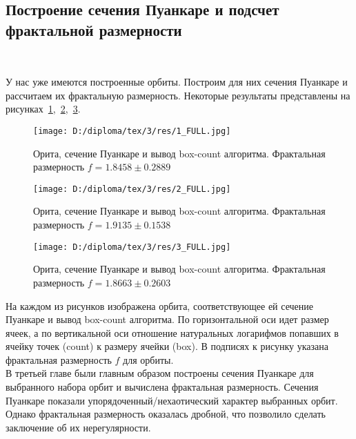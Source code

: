 \subsection{Построение сечения Пуанкаре и подсчет фрактальной размерности}
~\par
У нас уже имеются построенные орбиты. Построим для них сечения Пуанкаре и рассчитаем их фрактальную размерность. Некоторые результаты представлены на рисунках~\ref{stohast:1},~\ref{stohast:2},~\ref{stohast:3}.
{
\begin{figure}[H]
\centering
\begin{minipage}[t]{0.8\textwidth}
\centering
\texttt{[image: D:/diploma/tex/3/res/1\_FULL.jpg]}
\end{minipage}
\caption{Орита, сечение Пуанкаре и вывод box-count алгоритма. Фрактальная размерность $f = 1.8458 \pm 0.2889$}\label{stohast:1}
\end{figure}
}

{
\begin{figure}[H]
\centering
\begin{minipage}[t]{0.8\textwidth}
\centering
\texttt{[image: D:/diploma/tex/3/res/2\_FULL.jpg]}
\end{minipage}
\caption{Орита, сечение Пуанкаре и вывод box-count алгоритма. Фрактальная размерность $f = 1.9135 \pm 0.1538$}\label{stohast:2}
\end{figure}
}

{
\begin{figure}[H]
\centering
\begin{minipage}[t]{0.8\textwidth}
\centering
\texttt{[image: D:/diploma/tex/3/res/3\_FULL.jpg]}
\end{minipage}
\caption{Орита, сечение Пуанкаре и вывод box-count алгоритма. Фрактальная размерность $f = 1.8663 \pm 0.2603$}\label{stohast:3}
\end{figure}
}

На каждом из рисунков изображена орбита, соответствующее ей сечение Пуанкаре и вывод box-count алгоритма. По горизонтальной оси идет размер ячеек, а по вертикальной оси отношение натуральных логарифмов попавших в ячейку точек (count) к размеру ячейки (box). В подписях к рисунку указана фрактальная размерность $f$ для орбиты.\\

В третьей главе были главным образом построены сечения Пуанкаре для выбранного набора орбит и вычислена фрактальная размерность. Сечения Пуанкаре показали упорядоченный/нехаотический характер выбранных орбит. Однако фрактальная размерность оказалась дробной, что позволило сделать заключение об их нерегулярности.